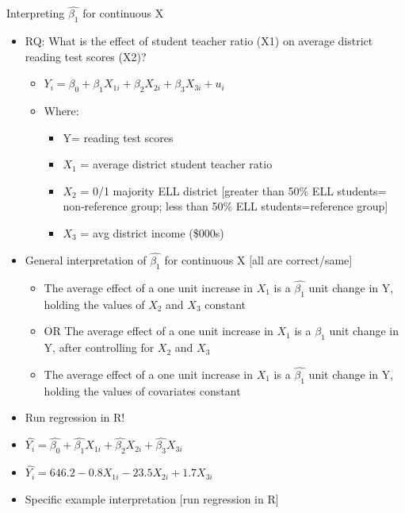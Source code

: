 \documentclass[
  8pt,
  ignorenonframetext,
  dvipsnames]{beamer}
\providecommand{\tightlist}{%
  \setlength{\itemsep}{0pt}\setlength{\parskip}{0pt}}
\let\olditem\item
\renewcommand{\item}{%
  \olditem\vspace{4pt}
}
\begin{document}
\begin{frame}{Interpreting \(\hat{\beta_1}\) for continuous X}
\protect\hypertarget{interpreting-hatbeta_1-for-continuous-x}{}

\begin{itemize}
\tightlist
\item
  RQ: What is the effect of student teacher ratio (X1) on average
  district reading test scores (X2)?

  \begin{itemize}
  \tightlist
  \item
    \(Y_i = \beta_0 + \beta_1X_{1i} + \beta_2X_{2i} + \beta_3X_{3i} + u_i\)
  \item
    Where:

    \begin{itemize}
    \tightlist
    \item
      Y= reading test scores
    \item
      \(X_1\) = average district student teacher ratio
    \item
      \(X_2\) = 0/1 majority ELL district {[}greater than 50\% ELL
      students= non-reference group; less than 50\% ELL
      students=reference group{]}
    \item
      \(X_3\) = avg district income (\$000s)
    \end{itemize}
  \end{itemize}
\item
  General interpretation of \(\hat{\beta_1}\) for continuous X {[}all
  are correct/same{]}

  \begin{itemize}
  \tightlist
  \item
    The average effect of a one unit increase in \(X_1\) is a
    \(\hat{\beta_1}\) unit change in Y, holding the values of \(X_2\)
    and \(X_3\) constant
  \item
    OR The average effect of a one unit increase in \(X_1\) is a
    \(\hat{\beta_1}\) unit change in Y, after controlling for \(X_2\)
    and \(X_3\)
  \item
    The average effect of a one unit increase in \(X_1\) is a
    \(\hat{\beta_1}\) unit change in Y, holding the values of covariates
    constant
  \end{itemize}
\item
  Run regression in R!
\item
  \(\hat{Y_i} = \hat{\beta_0} + \hat{\beta_1} X_{1i} + \hat{\beta_2} X_{2i} + \hat{\beta_3} X_{3i}\)
\item
  \(\hat{Y_i} = 646.2 - 0.8 X_{1i} -23.5 X_{2i} + 1.7 X_{3i}\)
\item
  Specific example interpretation {[}run regression in R{]}


\end{itemize}
\end{frame}
\end{document}

